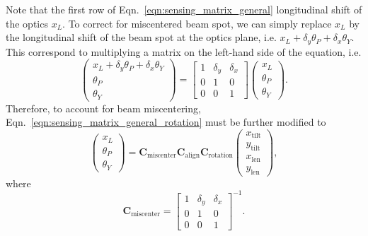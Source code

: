 Note that the first row of Eqn.~\eqref{eqn:sensing_matrix_general} longitudinal shift of the optics $x_L$.
To correct for miscentered beam spot, we can simply replace $x_L$ by the longitudinal shift of the beam spot at the optics plane, i.e. $x_L + \delta_y\theta_P + \delta_x\theta_Y$.
This correspond to multiplying a matrix on the left-hand side of the equation, i.e.
\begin{equation}
	\begin{pmatrix}
		x_L+\delta_y\theta_P+\delta_x\theta_Y\\
		\theta_P\\
		\theta_Y
	\end{pmatrix}
	=
	\begin{bmatrix}
		1 & \delta_y & \delta_x\\
		0 & 1 & 0\\
		0 & 0 & 1
	\end{bmatrix}
	\begin{pmatrix}
		x_L\\
		\theta_P\\
		\theta_Y
	\end{pmatrix}.
\end{equation}
Therefore, to account for beam miscentering, Eqn.~\ref{eqn:sensing_matrix_general_rotation} must be further modified to
\begin{equation}
	\begin{pmatrix}
		x_L\\
		\theta_P\\
		\theta_Y
	\end{pmatrix}
	=
	\mathbf{C}_\mathrm{miscenter}
	\mathbf{C}_\mathrm{align}
	\mathbf{C}_\mathrm{rotation}
	\begin{pmatrix}
		x_\mathrm{tilt}\\
		y_\mathrm{tilt}\\
		x_\mathrm{len}\\
		y_\mathrm{len}
	\end{pmatrix},
	\label{eqn:sensing_matrix_general_misalignment}
\end{equation}
where
\begin{equation}
	\mathbf{C}_\mathrm{miscenter}
	=
	\begin{bmatrix}
		1 & \delta_y & \delta_x\\
		0 & 1 & 0\\
		0 & 0 & 1
	\end{bmatrix}^{-1}.
\end{equation}

